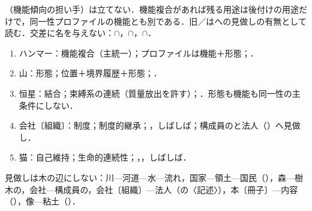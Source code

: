 \documentclass[../../main-detail.tex]{subfiles}
\begin{document}
（機能傾向の担い手）は立てない．機能複合があれば残る用途は後付けの用途だけで，同一性プロファイルの機能とも別である．旧／はへの見做しの有無として読む．交差に名を与えない：$\cap$，$\cap$，$\cap$．
\begin{example}
  \begin{enumerate}
    \item ハンマー：機能複合（主統一）；プロファイルは機能＋形態；．
    \item 山：形態；位置＋境界履歴＋形態；．
    \item 恒星：結合；束縛系の連続（質量放出を許す）；．形態も機能も同一性の主条件にしない．
    \item 会社〔組織〕：制度；制度的継承；，しばしば；構成員のと法人（）へ見做し．
    \item 猫：自己維持；生命的連続性；，，しばしば．
  \end{enumerate}
\end{example}
見做しは木の辺にしない：川—河道—水—流れ，国家—領土—国民（），森—樹木の，会社—構成員の，会社〔組織〕—法人（の〈記述〉），本〔冊子〕—内容（），像—粘土（）．
\end{document}
